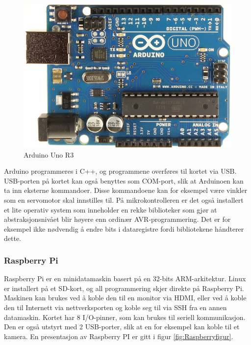 \begin{figure}[h!]
\centering
\includegraphics[scale = 0.25]{img/arduinoBoard.jpg}
\caption{Arduino Uno R3 \cite{Arduino}}
\label{fig:Arduino}
\end{figure}

Arduino programmeres i C++, og programmene overføres til kortet via USB. USB-porten på kortet kan også benyttes som COM-port, slik at Arduinoen kan ta inn eksterne kommandoer. Disse kommandoene kan for eksempel være vinkler som en servomotor skal innstilles til. På mikrokontrolleren er det også installert et lite operativ system som inneholder en rekke biblioteker som gjør at abstraksjonsnivået blir høyere enn ordinær AVR-programmering. Det er for eksempel ikke nødvendig å endre bits i dataregistre fordi bibliotekene håndterer dette. 

\subsubsection{Raspberry Pi}
\label{sec:Pi}
Raspberry Pi er en minidatamaskin basert på en 32-bits ARM-arkitektur. Linux er installert på et SD-kort, og all programmering skjer direkte på Raspberry Pi. Maskinen kan brukes ved å koble den til en monitor via HDMI, eller ved å koble den til Internett via nettverksporten og koble seg til via SSH fra en annen datamaskin. Kortet har 8 I/O-pinner, som kan brukes til seriell kommunikasjon. Den er også utstyrt med 2 USB-porter, slik at en for eksempel kan koble til et kamera. En presentasjon av Raspberry PI er gitt i figur \ref{fig:Raspberryfigur}.

